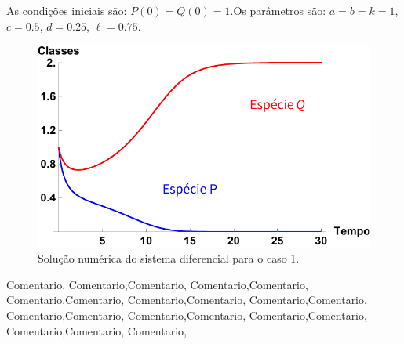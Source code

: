 As condições iniciais são: $P(0)=Q(0)=1$.\newline Os parâmetros são:  $a=b=k=1$, $c=0.5$, $d=0.25$, $\ell=0.75$.

\begin{figure}[htbp]
\centering
\includegraphics[keepaspectratio=true,scale=0.75]{caso1_a.pdf}
\caption{Solução numérica do sistema diferencial para o caso 1.}
\label{fig:x}
\end{figure}
\bigskip
\noindent
Comentario, Comentario,Comentario, Comentario,Comentario, Comentario,Comentario, Comentario,Comentario, Comentario,Comentario, Comentario,Comentario, Comentario,Comentario, Comentario,Comentario, Comentario,Comentario, Comentario,

